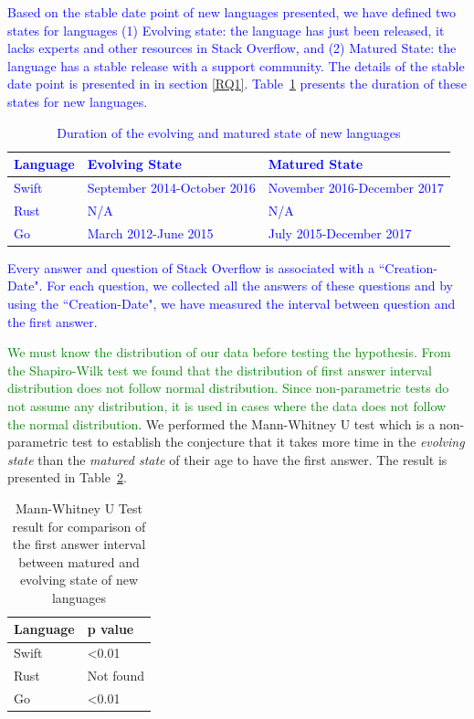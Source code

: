 \textcolor{blue}{Based on the stable date point of new languages presented, we have defined two states for languages (1) Evolving state: the language has just been released, it lacks experts and other resources in Stack Overflow, and (2) Matured State: the language has a stable release with a support community. The details of the stable date point is presented in  in section \ref{RQ1}. Table~\ref{table:States of languages} presents the duration of these states for new languages.
\begin{table}
\caption{Duration of the evolving and matured state of new languages}
\begin{tabular}{|l|l|l|}
\hline
 Language & Evolving State& Matured State \\ \hline
 Swift & September 2014-October 2016 & November 2016-December 2017  \\ \hline
 Rust & N/A & N/A \\ \hline
 Go & March 2012-June 2015 & July 2015-December 2017 \\ \hline
\end{tabular}%
\label{table:States of languages}
\end{table}
Every answer and question of Stack Overflow is associated with a ``Creation-Date". For each question, we collected all the answers of these questions and by using the ``Creation-Date", we have measured the interval between question and the first answer.}
\textcolor{green}{ We must know the distribution  of our data before testing the hypothesis. From the Shapiro-Wilk test\citep{SHAPIRO1965} we found that the distribution of first answer interval distribution does not follow normal distribution. Since non-parametric tests do not assume any distribution, it is used in cases where the data does not follow the normal distribution\citep{Mann1947}}. We performed the Mann-Whitney U test which is a non-parametric test to establish the conjecture that it takes more time in the \emph{evolving state} than the \emph{matured state} of their age to have the first answer. The result is presented in Table~\ref{table:Mann-Whitney Test answer interval between states}.


\begin{table}
\centering
\caption{Mann-Whitney U Test result for comparison of the first answer interval between matured and evolving state of new languages}
\begin{tabular}{|l|l|}
\hline
 Language & p value \\ \hline
 Swift & \textless 0.01  \\ \hline
 Rust & Not found \\ \hline
 Go &   \textless 0.01 \\ \hline
\end{tabular}%
\label{table:Mann-Whitney Test answer interval between states}
\end{table}

